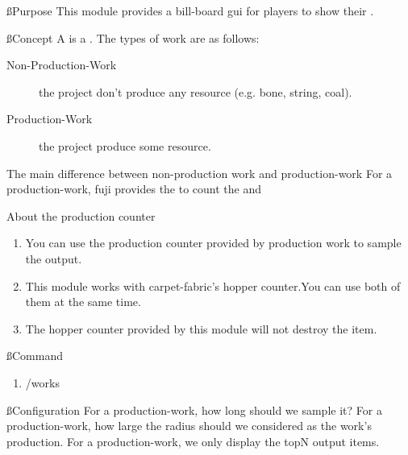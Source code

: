 
\ss{Purpose}
This module provides a bill-board gui for players to show their .

\ss{Concept}
A  is a .
The types of work are as follows:
\begin{description}
    \item [Non-Production-Work] the project don't produce any resource (e.g. bone, string, coal).
    \item[Production-Work] the project produce some resource.
\end{description}

\begin{tips}{The main difference between non-production work and production-work}
    For a production-work, fuji provides the  to count the  and 
\end{tips}

\begin{tips}{About the production counter}
    \begin{enumerate}
        \item You can use the production counter provided by production work to sample the output.
        \item This module works with carpet-fabric's hopper counter.You can use both of them at the same time.
        \item The hopper counter provided by this module will not destroy the item.
    \end{enumerate}

\end{tips}

\ss{Command}
\begin{enumerate}
    \item /works
\end{enumerate}

\ss{Configuration}
For a production-work, how long should we sample it?
For a production-work, how large the radius should we considered as the work's production.
For a production-work, we only display the topN output items.








